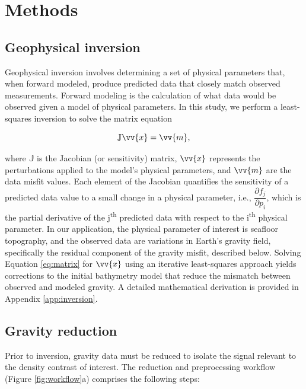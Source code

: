 \documentclass[tc, manuscript]{copernicus}
\begin{document}
\section{Methods}

\subsection{Geophysical inversion}

Geophysical inversion involves determining a set of physical parameters that, when forward modeled, produce predicted data that closely match observed measurements. Forward modeling is the calculation of what data would be observed given a model of physical parameters.  In this study, we perform a least-squares inversion to solve the matrix equation

\begin{equation}\label{eq:matrix}
     \mathbb{J} \vv{x} = \vv{m},
\end{equation}

where $\mathbb{J}$ is the Jacobian (or sensitivity) matrix, $\vv{x}$ represents the perturbations applied to the model's physical parameters, and $\vv{m}$ are the data misfit values. Each element of the Jacobian quantifies the sensitivity of a predicted data value to a small change in a physical parameter, i.e., $\dfrac{\partial f_j}{\partial p_i}$, which is the partial derivative of the j\textsuperscript{th} predicted data with respect to the i\textsuperscript{th} physical parameter. In our application, the physical parameter of interest is seafloor topography, and the observed data are variations in Earth's gravity field, specifically the residual component of the gravity misfit, described below. Solving Equation \ref{eq:matrix} for $\vv{x}$ using an iterative least-squares approach yields corrections to the initial bathymetry model that reduce the mismatch between observed and modeled gravity. A detailed mathematical derivation is provided in Appendix \ref{app:inversion}.

\subsection{Gravity reduction}
Prior to inversion, gravity data must be reduced to isolate the signal relevant to the density contrast of interest. The reduction and preprocessing workflow (Figure \ref{fig:workflow}a) comprises the following steps:
\end{document}
